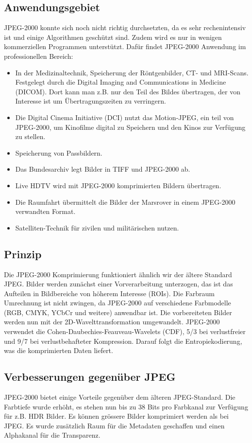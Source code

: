 \subsection{Anwendungsgebiet
\label{jpeg:subsection:anwendungsgebiet}}
JPEG-2000 konnte sich noch nicht richtig durchsetzten, da es sehr rechenintensiv ist und einige Algorithmen geschützt sind.
Zudem wird es nur in wenigen kommerziellen Programmen unterstützt.
Dafür findet JPEG-2000 Anwendung im professionellen Bereich:
\begin{itemize}
    \item In der Medizinaltechnik, Speicherung der Röntgenbilder, CT- und MRI-Scans.
    Festgelegt durch die Digital Imaging and Communications in Medicine (DICOM).
    Dort kann man z.B. nur den Teil des Bildes übertragen, der von Interesse ist um Übertragungszeiten zu verringern.
    \item Die Digital Cinema Initiative (DCI) nutzt das Motion-JPEG, ein teil von JPEG-2000, um Kinofilme digital zu Speichern und den Kinos zur Verfügung zu stellen.
    \item Speicherung von Passbildern.
    \item Das Bundesarchiv legt Bilder in TIFF und JPEG-2000 ab.
    \item Live HDTV wird mit JPEG-2000 komprimierten Bildern übertragen.
    \item Die Raumfahrt übermittelt die Bilder der Marsrover in einem JPEG-2000 verwandten Format.
    \item Satelliten-Technik für zivilen und militärischen nutzen.   
\end{itemize}


\subsection{Prinzip
\label{jpeg:subsection:prinzip}}
Die JPEG-2000 Komprimierung funktioniert ähnlich wir der ältere Standard JPEG.
Bilder werden zunächst einer Vorverarbeitung unterzogen, das ist das Aufteilen in Bildbereiche von höherem Interesse (ROIs).
Die Farbraum Umrechnung ist nicht zwingen, da JPEG-2000 auf verschiedene Farbmodelle (RGB, CMYK, YCbCr und weitere) anwendbar ist.
Die vorbereiteten Bilder werden nun mit der 2D-Wavelttransformation umgewandelt.
JPEG-2000 verwendet die Cohen-Daubechies-Feauveau-Wavelets (CDF), 5/3 bei verlustfreier und 9/7 bei verlustbehafteter Kompression.
Darauf folgt die Entropiekodierung, was die komprimierten Daten liefert. 

\subsection{Verbesserungen gegenüber JPEG
\label{jpeg:subsection:verbesserungen}}
JPEG-2000 bietet einige Vorteile gegenüber dem älteren JPEG-Standard.
Die Farbtiefe wurde erhöht, es stehen nun bis zu 38 Bits pro Farbkanal zur Verfügung für z.B. HDR Bilder.
Es können grössere Bilder komprimiert werden als bei JPEG.
Es wurde zusätzlich Raum für die Metadaten geschaffen und einen Alphakanal für die Transparenz.
 
